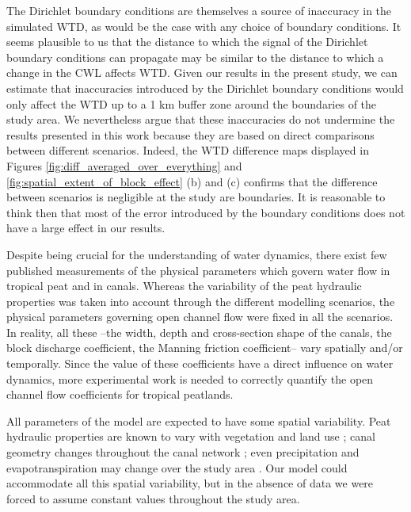 \documentclass[bg, manuscript]{copernicus}
\begin{document}
The   Dirichlet boundary conditions are themselves a source of inaccuracy in the simulated WTD, as would be the case with any choice of boundary conditions.
It seems plausible to us that the  distance to which the signal of the Dirichlet boundary conditions can propagate may be similar to the distance to which a change in the CWL affects WTD.
Given our results in the present study, we can estimate that inaccuracies introduced by the Dirichlet boundary conditions would only affect the WTD up to a 1 km buffer zone around the boundaries of the study area.
We nevertheless argue that these inaccuracies do not undermine the results presented in this work because they are based on direct comparisons between different scenarios.
Indeed, the WTD difference maps displayed in Figures \ref{fig:diff_averaged_over_everything} and \ref{fig:spatial_extent_of_block_effect} (b) and (c) confirms that the difference between scenarios is negligible at the study are boundaries.
It is reasonable to think then that most of the error introduced by the boundary conditions does not have a large effect in our results.

Despite being crucial for the understanding of water dynamics, there exist few published measurements of the physical parameters which govern water flow in tropical peat and in canals.
Whereas the variability of the peat hydraulic properties was taken into account through the different modelling scenarios, the physical parameters governing open channel flow were fixed in all the scenarios. 
In reality, all these --the width, depth and cross-section shape of the canals, the block discharge coefficient, the Manning friction coefficient-- vary spatially and/or temporally.
Since the value of these coefficients have a direct influence on water dynamics, more experimental work is needed to correctly quantify the open channel flow coefficients for tropical peatlands.

All parameters of the model are expected to have some spatial variability.
Peat hydraulic properties are known to vary with vegetation and land use  \citep{bairdHighPermeabilityExplains2017, kurniantoInfluenceLandcoverChanges2019}; canal geometry changes throughout the canal network \citep{ritzemaCanalBlockingStrategies2014, osakiTropicalPeatlandEcosystems2016}; even precipitation and evapotranspiration may change over the study area \citep{vijithSpatialTemporalCharacteristics2020}.
Our model could accommodate all this spatial variability, but in the absence of data we were forced to assume constant values throughout the study area.
\end{document}
